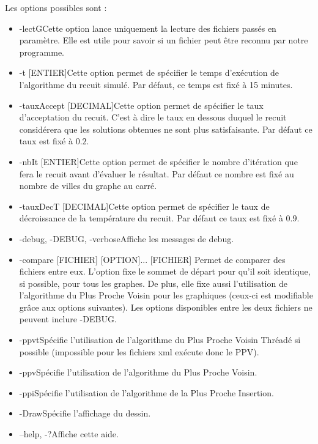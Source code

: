 \documentclass{article}
\begin{document}
Les options possibles sont :
\begin{itemize}
\item{-lectG}{Cette option lance uniquement la lecture des fichiers passés en paramètre. Elle est utile pour savoir si un fichier peut être reconnu par notre programme.}
\item{-t [ENTIER]}{Cette option permet de spécifier le temps d'exécution de l'algorithme du recuit simulé. Par défaut, ce temps est fixé à 15 minutes.}
\item{-tauxAccept [DECIMAL]}{Cette option permet de spécifier le taux d'acceptation du recuit. C'est à dire le taux en dessous duquel le recuit considérera que les solutions obtenues ne sont plus satisfaisante. Par défaut ce taux est fixé à $0.2$.}
\item{-nbIt [ENTIER]}{Cette option permet de spécifier le nombre d'itération que fera le recuit avant d'évaluer le résultat. Par défaut ce nombre est fixé au nombre de villes du graphe au carré.}
\item{-tauxDecT [DECIMAL]}{Cette option permet de spécifier le taux de décroissance de la température du recuit. Par défaut ce taux est fixé à $0.9$.}
\item{-debug, -DEBUG, -verbose}{Affiche les messages de debug.}
\item{-compare [FICHIER] [OPTION]... [FICHIER]}{
Permet de comparer des fichiers entre eux. L'option fixe le sommet de départ pour qu'il soit identique, si possible, pour tous les graphes.
De plus, elle fixe aussi l'utilisation de l'algorithme du Plus Proche Voisin pour les graphiques (ceux-ci est modifiable grâce aux options suivantes).
Les options disponibles entre les deux fichiers ne peuvent inclure -DEBUG.}
\item{-ppvt}{Spécifie l'utilisation de l'algorithme du Plus Proche Voisin Thréadé si possible (impossible pour les fichiers xml exécute donc le PPV).}
\item{-ppv}{Spécifie l'utilisation de l'algorithme du Plus Proche Voisin.}
\item{-ppi}{Spécifie l'utilisation de l'algorithme de la Plus Proche Insertion.}
\item{-Draw}{Spécifie l'affichage du dessin.}
\item{--help, -?}{Affiche cette aide.}
\end{itemize}															
							
\end{document}
